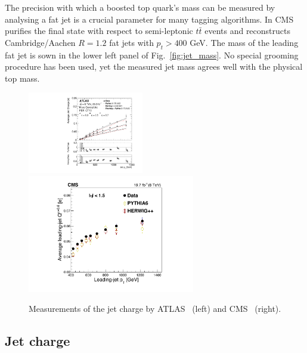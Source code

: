 The precision with which a boosted top quark's mass can be measured by analysing a fat jet is a crucial parameter for many tagging algorithms. In \cite{Sirunyan:2017yar} CMS purifies the final state with respect to semi-leptonic $t\bar{t}$ events and reconstructs Cambridge/Aachen $R=1.2$ fat jets with $p_t>400$ GeV. The mass of the leading fat jet is sown in the lower left panel of Fig.~\ref{fig:jet_mass}. No special grooming procedure has been used, yet the measured jet mass agrees well with the physical top mass. 



\begin{figure}[t]
  \includegraphics[width=0.45\textwidth]{figures/charge_ATLAS.pdf}
 \includegraphics[width=0.65\textwidth]{figures/charge_CMS.pdf}
  \caption{Measurements of the jet charge by ATLAS~\cite{Aad:2015cua} (left) and CMS~\cite{Sirunyan:2017tyr} (right).}\label{fig:exp_charge}
\end{figure}

\subsection{Jet charge}

